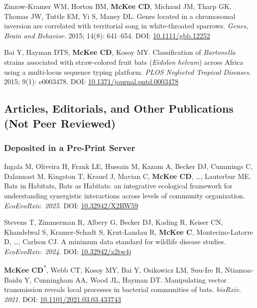 \documentclass{cv}
\begin{document}
\begin{pubenum}
\item Zinzow-Kramer WM, Horton BM, \textbf{McKee CD}, Michaud JM, Tharp GK, Thomas JW, Tuttle EM, Yi S, Maney DL. Genes located in a chromosomal inversion are correlated with territorial song in white-throated sparrows. \textit{Genes, Brain and Behavior}. 2015; 14(8): 641--654. DOI: \href{https://doi.org/10.1111/gbb.12252}{10.1111/gbb.12252}

\item Bai Y, Hayman DTS, \textbf{McKee CD}, Kosoy MY. Classification of \textit{Bartonella} strains associated with straw-colored fruit bats (\textit{Eidolon helvum}) across Africa using a multi-locus sequence typing platform. \textit{PLOS Neglected Tropical Diseases}. 2015; 9(1): e0003478. DOI: \href{https://doi.org/10.1371/journal.pntd.0003478}{10.1371/journal.pntd.0003478}

\end{pubenum}

\subsection*{Articles, Editorials, and Other Publications (Not Peer Reviewed)}

\subsubsection*{Deposited in a Pre-Print Server}

\begin{pubenum}

\item Ingala M, Oliveira H, Frank LE, Hussain M, Kazam A, Becker DJ, Cummings C, Dalannast M, Kingston T, Krauel J, Mavian C, \textbf{McKee CD}, …, Lauterbur ME. Bats in Habitats, Bats as Habitats: an integrative ecological framework for understanding synergistic interactions across levels of community organization. \textit{EcoEvoRxiv. 2025}. DOI: \href{https://doi.org/10.32942/X2RW59}{10.32942/X2RW59}

\item Stevens T, Zimmerman R, Albery G, Becker DJ, Kading R, Keiser CN, Khandelwal S, Kramer-Schadt S, Krut-Landau R, \textbf{McKee C}, Montecino-Latorre D, …, Carlson CJ. A minimum data standard for wildlife disease studies. \textit{EcoEvoRxiv. 2024}. DOI: \href{https://doi.org/10.32942/x2tw4j}{10.32942/x2tw4j}

\item \textbf{McKee CD}\textsuperscript{*}, Webb CT, Kosoy MY, Bai Y, Osikowicz LM, Suu-Ire R, Ntiamoa-Baidu Y, Cunningham AA, Wood JL, Hayman DT. Manipulating vector transmission reveals local processes in bacterial communities of bats. \textit{bioRxiv. 2021}. DOI: \href{https://doi.org/10.1101/2021.03.03.433743}{10.1101/2021.03.03.433743}

 \end{pubenum}
\end{document}
